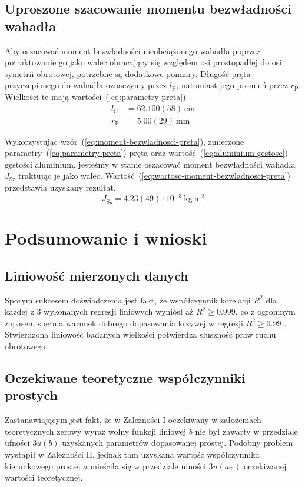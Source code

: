 \documentclass[twocolumn, a4paper, polish, 10pt]{article}
\newcommand{\JXn}[1]{\ensuremath{ J_{\mathrm{#1}} }}
\begin{document}
\subsection{Uproszone szacowanie momentu bezwładności wahadła}
Aby oszacować moment bezwładności nieobciążonego wahadła poprzez potraktowanie go jako walec obracający się względem osi prostopadłej do osi symetrii obrotowej, potrzebne są dodatkowe pomiary. Długość pręta przyczepionego do wahadła oznaczymy przez $l_{\mathrm{P}}$, natomiast jego promień przez $r_{\mathrm{P}}$. Wielkości te mają wartości~(\ref{eq:parametry-preta}).
\begin{equation}
\begin{split}
    l_{\mathrm{P}} &= 62.100(58)~\mathrm{cm} \\
    r_{\mathrm{P}} &= 5.00(29)~\mathrm{mm} 
    \label{eq:parametry-preta}
\end{split}
\end{equation}

Wykorzystując wzór~(\ref{eq:moment-bezwladnosci-preta}), zmierzone parametry~(\ref{eq:parametry-preta}) pręta oraz wartość~(\ref{eq:aluminium-gestosc}) gęstości aluminium, jesteśmy w stanie oszacować moment bezwładności wahadła $\JXn{Sz}$ traktując je jako walec. Wartość~(\ref{eq:wartosc-moment-bezwladnosci-preta}) przedstawia uzyskany rezultat.
\begin{equation}
    \JXn{Sz} = 4.23(49) \cdot 10^{-3}~\mathrm{kg~m^2}
    \label{eq:wartosc-moment-bezwladnosci-preta}
\end{equation}

\section{Podsumowanie i wnioski}
\subsection{Liniowość mierzonych danych}
Sporym sukcesem doświadczenia jest fakt, że współczynnik korelacji $R^2$ dla każdej z 3 wykonanych regresji liniowych wyniósł aż $R^2 \ge 0.999$, co z ogromnym zapasem spełnia warunek dobrego dopasowania krzywej w regresji $R^2 \geq 0.99$ \cite{epa-8000d}. Stwierdzona liniowość badanych wielkości potwierdza słuszność praw ruchu obrotowego.

\subsection{Oczekiwane teoretyczne współczynniki prostych}
Zastanawiającym jest fakt, że w Zależności I oczekiwany w założeniach teoretycznych zerowy wyraz wolny funkcji liniowej $b$ nie był zawarty w przedziale ufności $3u(b)$ uzyskanych parametrów dopasowanej prostej. Podobny problem wystąpił w Zależności II, jednak tam uzyskana wartość współczynnika kierunkowego prostej $a$ mieściła się w przedziale ufności $3u(a_{\mathrm{T}})$ oczekiwanej wartości teoretycznej.
\end{document}
